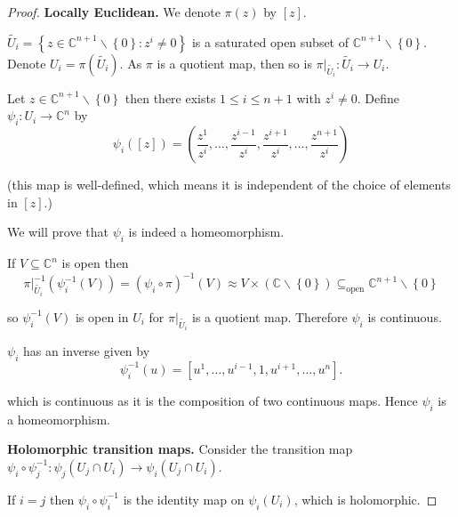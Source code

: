 \begin{proof}
    \textbf{Locally Euclidean.} We denote \( \pi(z) \) by \( [z] \).

    \( \widetilde{U_{i}} = \left\{ z \in \mathbb{C}^{n+1} \smallsetminus \left\{0\right\} : z^{i} \ne 0 \right\} \) is a saturated open subset of \( \mathbb{C}^{n+1} \smallsetminus \left\{0\right\} \). Denote \( U_{i} = \pi(\widetilde{U_{i}}) \). As \( \pi \) is a quotient map, then so is \( \pi\vert_{\widetilde{U_{i}}}: \widetilde{U_{i}} \to U_{i} \).

    Let \( z \in \mathbb{C}^{n+1} \smallsetminus \left\{ 0 \right\} \) then there exists \( 1 \le i \le n + 1 \) with \( z^{i} \ne 0 \). Define \( \psi_{i}: U_{i} \to \mathbb{C}^{n} \) by
    \[
        \psi_{i}([z]) = \left( \dfrac{z^{1}}{z^{i}}, \ldots, \dfrac{z^{i-1}}{z^{i}}, \dfrac{z^{i+1}}{z^{i}}, \ldots, \dfrac{z^{n+1}}{z^{i}} \right)
    \]

    (this map is well-defined, which means it is independent of the choice of elements in \([z]\).)

    We will prove that \( \psi_{i} \) is indeed a homeomorphism.

    If \( V \subseteq \mathbb{C}^{n} \) is open then
    \[
        \pi\vert_{\widetilde{U_{i}}}^{-1}(\psi_{i}^{-1}(V)) = {(\psi_{i} \circ \pi)}^{-1}(V) \approx V \times (\mathbb{C} \smallsetminus \left\{0\right\}) \subseteq_{\text{open}} \mathbb{C}^{n+1} \smallsetminus \left\{0\right\}
    \]

    so \( \psi_{i}^{-1}(V) \) is open in \( U_{i} \) for \( \pi\vert_{\widetilde{U_{i}}} \) is a quotient map. Therefore \( \psi_{i} \) is continuous.

    \( \psi_{i} \) has an inverse given by
    \[
        \psi_{i}^{-1}(u) = [u^{1}, \ldots, u^{i-1}, 1, u^{i+1}, \ldots, u^{n}].
    \]

    which is continuous as it is the composition of two continuous maps. Hence \( \psi_{i} \) is a homeomorphism.

    \textbf{Holomorphic transition maps.} Consider the transition map \( \psi_{i} \circ \psi_{j}^{-1}: \psi_{j}(U_{j} \cap U_{i}) \to \psi_{i}(U_{j} \cap U_{i}) \).

    If \( i = j \) then \( \psi_{i} \circ \psi_{i}^{-1} \) is the identity map on \( \psi_{i}(U_{i}) \), which is holomorphic.


\end{proof}
